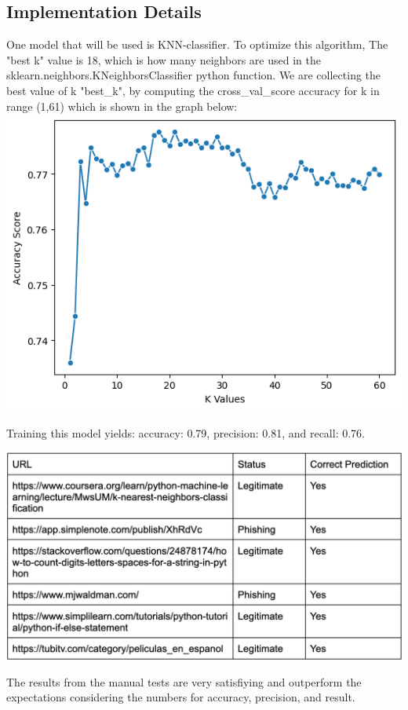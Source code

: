 \documentclass[conference]{IEEEtran}
\begin{document}
\subsection{Implementation Details}
One model that will be used is KNN-classifier. To optimize this algorithm, The "best k" value is 18, which is how many neighbors are used in the sklearn.neighbors.KNeighborsClassifier python function. We are collecting the best value of k "best_k", by computing the cross_val_score accuracy for k in range (1,61) which is shown in the graph below:
\includegraphics{best-k-value.png}

Training this model yields: accuracy: 0.79, precision: 0.81, and recall: 0.76.

\includegraphics{knnManualTest.png}

The results from the manual tests are very satisfiying and outperform the expectations considering the numbers for accuracy, precision, and result. 
\end{document}
